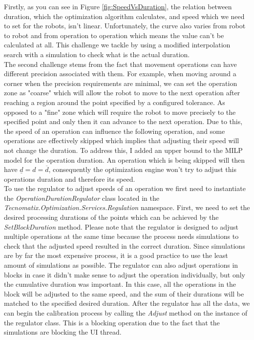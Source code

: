 Firstly, as you can see in Figure \ref{fig:SpeedVsDuration}, the relation between duration, which the optimization algorithm calculates, and speed which we need to set for the robots, isn't linear. Unfortunately, the curve also varies from robot to robot and from operation to operation which means the value can't be calculated at all. This challenge we tackle by using a modified interpolation search with a simulation to check what is the actual duration. \\

The second challenge stems from the fact that movement operations can have different precision associated with them. For example, when moving around a corner when the precision requirements are minimal, we can set the operation zone as "coarse" which will allow the robot to move to the next operation after reaching a region around the point specified by a configured tolerance. As opposed to a "fine" zone which will require the robot to move precisely to the specified point and only then it can advance to the next operation. Due to this, the speed of an operation can influence the following operation, and some operations are effectively skipped which implies that adjusting their speed will not change the duration. To address this, I added an upper bound to the MILP model for the operation duration. An operation which is being skipped will then have $\underline{d} = d = \overline{d}$, consequently the optimization engine won't try to adjust this operations duration and therefore its speed. \\

To use the regulator to adjust speeds of an operation we first need to instantiate the \emph{OperationDurationRegulator} class located in the \emph{Tecnomatix.Optimization.Services.Regulation} namespace. First, we need to set the desired processing durations of the points which can be achieved by the \emph{SetBlockDuration} method. Please note that the regulator is designed to adjust multiple operations at the same time because the process needs simulations to check that the adjusted speed resulted in the correct duration. Since simulations are by far the most expensive process, it is a good practice to use the least amount of simulations as possible. The regulator can also adjust operations in blocks in case it didn't make sense to adjust the operation individually, but only the cumulative duration was important. In this case, all the operations in the block will be adjusted to the same speed, and the sum of their durations will be matched to the specified desired duration. After the regulator has all the data, we can begin the calibration process by calling the \emph{Adjust} method on the instance of the regulator class. This is a blocking operation due to the fact that the simulations are blocking the UI thread. \\

